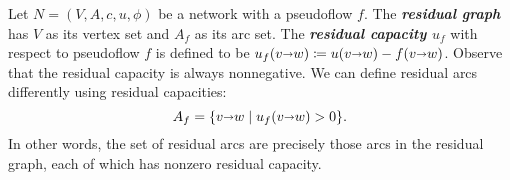 \documentclass[a4paper,UKenglish]{socg-lipics-v2018}
\makeatletter
\def\note#1{\textcolor{red}{{#1}}}
\def\eps{\varepsilon}
\def\fsupply{\phi}
\def\arcto{\mathord\shortrightarrow}
\def\arc#1#2{#1\arcto#2}
\theoremstyle{plain}
\numberwithin{figure}{section}
\def\EMPH#1{\textbf{\emph{\boldmath #1}}}
\def\n@te#1{\textsf{\boldmath \textbf{$\langle\!\langle$#1$\rangle\!\rangle$}}\leavevmode}
\def\note#1{\textcolor{red}{\n@te{#1}}}
\makeatother
\begin{document}
Let $N = (V,A,c,u,\fsupply)$ be a network with a pseudoflow $f$.
The \EMPH{residual graph} has $V$ as its vertex set and $A_f$ as its arc set.
%
The \EMPH{residual capacity $u_f$} with respect to
pseudoflow $f$ is defined to be $u_f(\arc vw) \coloneqq u(\arc vw) - f(\arc vw)$.
Observe that the residual capacity is always nonnegative.
We can define residual arcs differently using residual capacities:
\[
A_f = \{\arc vw \mid u_f(\arc vw) > 0\}.
\]
In other words, the set of residual arcs  are precisely those arcs in the residual graph, each of which has nonzero residual capacity.
%
%
%

%
%
%
\end{document}
